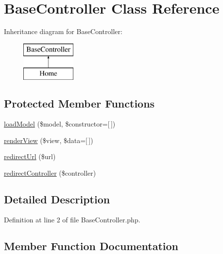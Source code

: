 \hypertarget{class_base_controller}{}\section{Base\+Controller Class Reference}
\label{class_base_controller}
Inheritance diagram for Base\+Controller\+:\begin{figure}[H]
\begin{center}
\leavevmode
\includegraphics[height=2.000000cm]{class_base_controller}
\end{center}
\end{figure}
\subsection*{Protected Member Functions}
\begin{DoxyCompactItemize}
\item 
\hyperlink{class_base_controller_a710080f75b12adc69eb506ee63cffe6b}{load\+Model} (\$model, \$constructor=\mbox{[}$\,$\mbox{]})
\item 
\hyperlink{class_base_controller_a2baad3faf609bcd81f81cf8e9713ec01}{render\+View} (\$view, \$data=\mbox{[}$\,$\mbox{]})
\item 
\hyperlink{class_base_controller_a73ab7b9209ca7fd12d9f8d2114c1c825}{redirect\+Url} (\$url)
\item 
\hyperlink{class_base_controller_ad16dba8468d26e5ec0f30a415af257c0}{redirect\+Controller} (\$controller)
\end{DoxyCompactItemize}


\subsection{Detailed Description}


Definition at line 2 of file Base\+Controller.\+php.



\subsection{Member Function Documentation}
\hypertarget{class_base_controller_a710080f75b12adc69eb506ee63cffe6b}{}\label{class_base_controller_a710080f75b12adc69eb506ee63cffe6b} 

